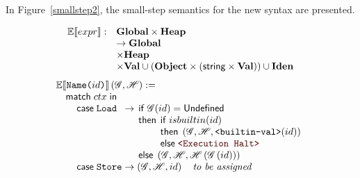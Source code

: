%
%
%
%

In Figure~\ref{smallstep2}, the small-step semantics for the new syntax are presented.

\begin{figure}
\[\begin{array}{rl}
  \mathbb{E}\!\left\llbracket expr \right\rrbracket :& \mathbf{Global} \times \mathbf{Heap} \\
  &\to \mathbf{Global} \\
  &\times \mathbf{Heap} \\\
  &\times \mathbf{Val} \cup (\mathbf{Object} \times (\textsf{string} \times \mathbf{Val})) \cup \mathbf{Iden} \\
\end{array}\]
\[\arraycolsep=1.4pt
  \begin{array}[t]{l}
    \Ctx{E}{\SLit{Name}{id}}\left(\Glo, \Hea\right) := \\
    \quad \matchm{ctx} \\
    \qquad \begin{array}[t]{lclr}
      \casem{\SLoad} &\to&
         \begin{array}[t]{l}
            \ifm \Glo(id) = \undefm \\
            \thenm
               \begin{array}[t]{l}
                  \ifm isbuiltin(id) \\
                  \thenm \left(\Glo, \Hea, \texttt{<builtin-val>}(id)\right) \\
                  \elsem \Halt \\
               \end{array} \\
            \elsem \left(\Glo, \Hea, \Hea\left(\Glo\left(id\right)\right)\right) \\
         \end{array} \\
      \casem{\SStore} &\to& \left(\Glo, \Hea, id\right) \quad \textit{to be assigned} \\

\end{array}
\end{array}\]
\end{figure}
